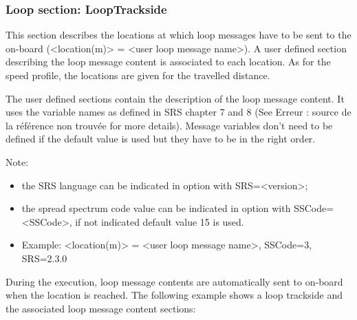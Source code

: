 \documentclass{template/openetcs}
\begin{document}
\subsubsection{Loop  section: LoopTrackside}

	This section describes the locations at which loop messages have to be sent to the on-board (<location(m)> = <user loop message name>). A user defined section describing the loop message content is associated to each location. As for the speed profile, the locations are given for the travelled distance.
	
	The user defined sections contain the description of the loop message content. It uses the variable names as defined in SRS chapter 7 and 8 (See Erreur : source de la référence non trouvée for more details). Message variables don’t need to be defined if the default value is used but they have to be in the right order.
	
	Note:
	
	\begin{itemize}
		\item the SRS language can be indicated in option with SRS=<version>;
		\item the spread spectrum code value can be indicated in option with SSCode=<SSCode>, if not indicated default value 15 is used.
		\item Example: <location(m)> = <user loop message name>, SSCode=3, SRS=2.3.0
		
	\end{itemize} 
	
	During the execution, loop message contents are automatically sent to on-board when the location is reached.
	The following example shows a loop trackside and the associated loop message content sections:
	
\end{document}
